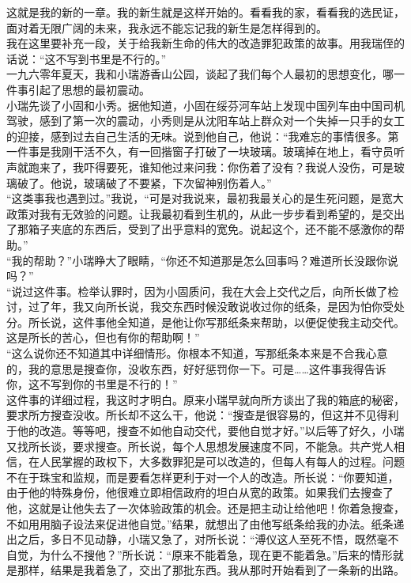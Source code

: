 这就是我的新的一章。我的新生就是这样开始的。看看我的家，看看我的选民证，面对着无限广阔的未来，我永远不能忘记我的新生是怎样得到的。\\

我在这里要补充一段，关于给我新生命的伟大的改造罪犯政策的故事。用我瑞侄的话说：“这不写到书里是不行的。”\\

一九六零年夏天，我和小瑞游香山公园，谈起了我们每个人最初的思想变化，哪一件事引起了思想的最初震动。\\

小瑞先谈了小固和小秀。据他知道，小固在绥芬河车站上发现中国列车由中国司机驾驶，感到了第一次的震动，小秀则是从沈阳车站上群众对一个失掉一只手的女工的迎接，感到过去自己生活的无味。说到他自己，他说：“我难忘的事情很多。第一件事是我刚干活不久，有一回揩窗子打破了一块玻璃。玻璃掉在地上，看守员听声就跑来了，我吓得要死，谁知他过来问我：你伤着了没有？我说人没伤，可是玻璃破了。他说，玻璃破了不要紧，下次留神别伤着人。”\\

“这类事我也遇到过。”我说，“可是对我说来，最初我最关心的是生死问题，是宽大政策对我有无效验的问题。让我最初看到生机的，从此一步步看到希望的，是交出了那箱子夹底的东西后，受到了出乎意料的宽免。说起这个，还不能不感激你的帮助。”\\

“我的帮助？”小瑞睁大了眼睛，“你还不知道那是怎么回事吗？难道所长没跟你说吗？”\\

“说过这件事。检举认罪时，因为小固质问，我在大会上交代之后，向所长做了检讨，过了年，我又向所长说，我交东西时候没敢说收过你的纸条，是因为怕你受处分。所长说，这件事他全知道，是他让你写那纸条来帮助，以便促使我主动交代。这是所长的苦心，但也有你的帮助啊！”\\

“这么说你还不知道其中详细情形。你根本不知道，写那纸条本来是不合我心意的，我的意思是搜查你，没收东西，好好惩罚你一下。可是……这件事我得告诉你，这不写到你的书里是不行的！”\\

这件事的详细过程，我这时才明白。原来小瑞早就向所方谈出了我的箱底的秘密，要求所方搜查没收。所长却不这么干，他说：“搜查是很容易的，但这并不见得利于他的改造。等等吧，搜查不如他自动交代，要他自觉才好。”以后等了好久，小瑞又找所长谈，要求搜查。所长说，每个人思想发展速度不同，不能急。共产党人相信，在人民掌握的政权下，大多数罪犯是可以改造的，但每人有每人的过程。问题不在于珠宝和监规，而是要看怎样更利于对一个人的改造。所长说：“你要知道，由于他的特殊身份，他很难立即相信政府的坦白从宽的政策。如果我们去搜查了他，这就是让他失去了一次体验政策的机会。还是把主动让给他吧！你着急搜查，不如用用脑子设法来促进他自觉。”结果，就想出了由他写纸条给我的办法。纸条递出之后，多日不见动静，小瑞又急了，对所长说：“溥仪这人至死不悟，既然毫不自觉，为什么不搜他？”所长说：“原来不能着急，现在更不能着急。”后来的情形就是那样，结果是我着急了，交出了那批东西。我从那时开始看到了一条新的出路。\\

